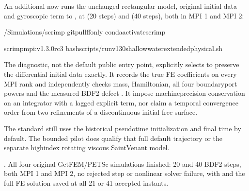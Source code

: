 \documentclass[letterpaper,10pt,english]{sphinxmanual}
\begin{document}
\sphinxAtStartPar
An additional  now runs the
unchanged rectangular model, original initial data and
 gyroscopic term to
, at  (20 steps) and
 (40 steps), both in MPI 1 and MPI 2:

\begin{sphinxVerbatim}[commandchars=\\\{\}]
\PYGZti{}/Simulations/scrimp
gitpull\PYGZhy{}\PYGZhy{}ff\PYGZhy{}only
condaactivatescrimp

scrimp\PYGZhy{}mpi:v1.3.0\PYGZhy{}rc3
bashscripts/run\PYGZhy{}v130\PYGZhy{}shallow\PYGZhy{}water\PYGZhy{}extended\PYGZhy{}physical.sh
\end{sphinxVerbatim}

\sphinxAtStartPar
The diagnostic, not the default public entry point, explicitly
selects 
to preserve the  differential initial
data exactly. It records the true FE coefficients on every
MPI rank and independently checks mass, Hamiltonian, all
four boundary\sphinxhyphen{}port powers and the measured BDF2 defect
.
It  impose machine\sphinxhyphen{}precision conservation on
an integrator with a lagged explicit term, nor claim
a temporal convergence order from two refinements
of a discontinuous initial free surface.

\sphinxAtStartPar
The standard  still uses the
historical pseudo\sphinxhyphen{}time initialization and final time
 by default. The bounded pilot does 
qualify that full default trajectory or the separate
high\sphinxhyphen{}index rotating viscous Saint\sphinxhyphen{}Venant model.

\sphinxAtStartPar
{}
.
All four original GetFEM/PETSc simulations finished:
20 and 40 BDF2 steps, both MPI 1 and MPI 2, no rejected
step or nonlinear solver failure, with  and the full FE solution saved
at all 21 or 41 accepted instants.
\end{document}
